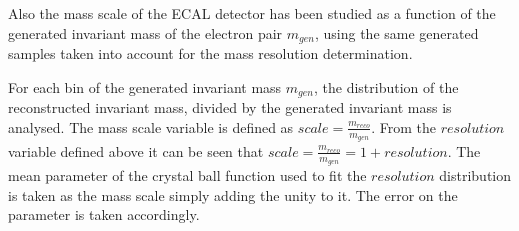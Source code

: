 %
%
%
%
%
%
\medskip
Also the mass scale of the ECAL detector has been studied as a function of the generated invariant mass of the electron pair $m_{gen}$, using the same generated samples taken into account for the mass resolution determination.

For each bin of the generated invariant mass $m_{gen}$, the distribution of the reconstructed invariant mass,
divided by the generated invariant mass is analysed.
The mass scale variable is defined as $scale =\frac{m_{reco}}{m_{gen}}$.  From the $resolution$ variable defined above it can be seen that $scale= \frac{m_{reco}}{m_{gen}}= 1 + resolution$.
The mean parameter of the crystal ball function used to fit the $resolution$ distribution is taken as the mass scale simply adding the unity to it. The error on the parameter is taken accordingly.

